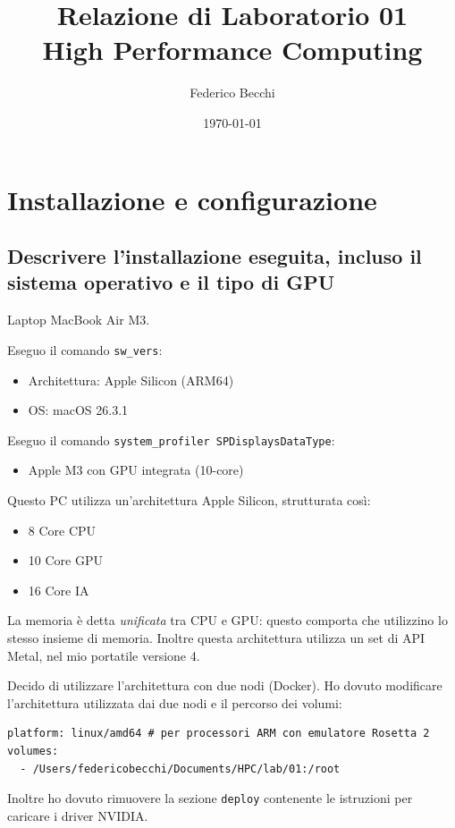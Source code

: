 \documentclass[11pt,a4paper]{article}
\title{Relazione di Laboratorio 01 \\ High Performance Computing}
\author{Federico Becchi}
\date{\today}
\begin{document}
\maketitle

\section{Installazione e configurazione}

\subsection{Descrivere l'installazione eseguita, incluso il sistema operativo e il tipo di GPU}

Laptop MacBook Air M3.

Eseguo il comando \texttt{sw\_vers}:
\begin{itemize}
    \item Architettura: Apple Silicon (ARM64)
    \item OS: macOS 26.3.1
\end{itemize}

Eseguo il comando \texttt{system\_profiler SPDisplaysDataType}:
\begin{itemize}
    \item Apple M3 con GPU integrata (10-core)
\end{itemize}

Questo PC utilizza un'architettura Apple Silicon, strutturata così:
\begin{itemize}
    \item 8 Core CPU
    \item 10 Core GPU
    \item 16 Core IA
\end{itemize}

La memoria è detta \emph{unificata} tra CPU e GPU: questo comporta che utilizzino lo stesso insieme di memoria. Inoltre questa architettura utilizza un set di API Metal, nel mio portatile versione 4.

Decido di utilizzare l'architettura con due nodi (Docker). Ho dovuto modificare l'architettura utilizzata dai due nodi e il percorso dei volumi:

\begin{lstlisting}
platform: linux/amd64 # per processori ARM con emulatore Rosetta 2
volumes:
  - /Users/federicobecchi/Documents/HPC/lab/01:/root
\end{lstlisting}

Inoltre ho dovuto rimuovere la sezione \texttt{deploy} contenente le istruzioni per caricare i driver NVIDIA.
\end{document}
